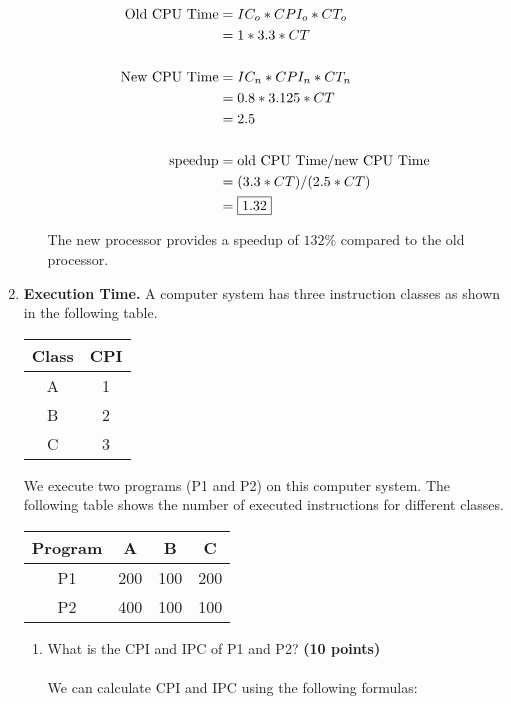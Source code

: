 \documentclass[a4paper, 15pt]{exam}
\begin{document}
\begin{enumerate}
\begin{enumerate}
   	\begin{align*} 
   			\text{Old CPU Time} &= IC_o * CPI_o * CT_o \\
   			&= 1 * 3.3 * CT \\ \\			
   			\text{New CPU Time} &= IC_n * CPI_n * CT_n \\
   			&= 0.8 * 3.125 * CT \\
   			&= 2.5 \\ \\
   			\text{speedup} &= \text{old CPU Time} / \text{new CPU Time} \\
   			&= (3.3 * CT) / (2.5 * CT) \\ 
   			&= \fbox{1.32}
   	\end{align*}
   	
   	The new processor provides a speedup of $132\%$ compared to the old processor.

	\end{enumerate}
    \item \textbf{Execution Time.} A computer system has three instruction classes as shown in the following table.
\begin{center}
\begin{tabular}{ |c|c|} 
 \hline
  
  Class&CPI\\ 
  \hline
 A&1\\ 
 \hline
 B&2\\ 
 \hline
 C&3\\ 
 \hline
\end{tabular}
\end{center}
We execute two programs (P1 and P2) on this computer system. The following table shows the number of executed instructions for different classes.

\begin{center}
\begin{tabular}{ |c|c|c|c|} 
 \hline
  
  Program&A&B&C\\ 
  \hline
 P1&200&100&200\\ 
 \hline
 P2&400&100&100\\ 
 \hline
 
\end{tabular}
\end{center}
\begin{enumerate}
\item What is the CPI and IPC of P1 and P2?
\textbf{(10 points)} \\ \\
We can calculate CPI and IPC using the following formulas:


\end{enumerate}
\end{enumerate}
\end{document}
